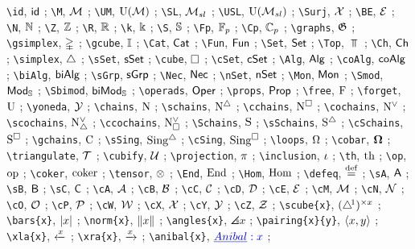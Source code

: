 \verb|\id|, $\id$ ;
\verb|\M|, $\M$ ;
\verb|\UM|, $\UM$ ;
\verb|\SL|, $\SL$ ;
\verb|\USL|, $\USL$ ;
\verb|\Surj|, $\Surj$ ;
\verb|\BE|, $\BE$ ;
\verb|\N|, $\N$ ;
\verb|\Z|, $\Z$ ;
\verb|\R|, $\R$ ;
\verb|\k|, $\k$ ;
\verb|\S|, $\S$ ;
\verb|\Fp|, $\Fp$ ;
\verb|\Cp|, $\Cp$ ;
\verb|\graphs|, $\graphs$ ;
\verb|\gsimplex|, $\gsimplex$ ;
\verb|\gcube|, $\gcube$ ;
\verb|\Cat|, $\Cat$ ;
\verb|\Fun|, $\Fun$ ;
\verb|\Set|, $\Set$ ;
\verb|\Top|, $\Top$ ;
\verb|\Ch|, $\Ch$ ;
\verb|\simplex|, $\simplex$ ;
\verb|\sSet|, $\sSet$ ;
\verb|\cube|, $\cube$ ;
\verb|\cSet|, $\cSet$ ;
\verb|\Alg|, $\Alg$ ;
\verb|\coAlg|, $\coAlg$ ;
\verb|\biAlg|, $\biAlg$ ;
\verb|\sGrp|, $\sGrp$ ;
\verb|\Nec|, $\Nec$ ;
\verb|\nSet|, $\nSet$ ;
\verb|\Mon|, $\Mon$ ;
\verb|\Smod|, $\Smod$ ;
\verb|\Sbimod|, $\Sbimod$ ;
\verb|\operads|, $\operads$ ;
\verb|\props|, $\props$ ;
\verb|\free|, $\free$ ;
\verb|\forget|, $\forget$ ;
\verb|\yoneda|, $\yoneda$ ;
\verb|\chains|, $\chains$ ;
\verb|\schains|, $\schains$ ;
\verb|\cchains|, $\cchains$ ;
\verb|\cochains|, $\cochains$ ;
\verb|\scochains|, $\scochains$ ;
\verb|\ccochains|, $\ccochains$ ;
\verb|\Schains|, $\Schains$ ;
\verb|\sSchains|, $\sSchains$ ;
\verb|\cSchains|, $\cSchains$ ;
\verb|\gchains|, $\gchains$ ;
\verb|\sSing|, $\sSing$ ;
\verb|\cSing|, $\cSing$ ;
\verb|\loops|, $\loops$ ;
\verb|\cobar|, $\cobar$ ;
\verb|\triangulate|, $\triangulate$ ;
\verb|\cubify|, $\cubify$ ;
\verb|\projection|, $\projection$ ;
\verb|\inclusion|, $\inclusion$ ;
\verb|\th|, $\th$ ;
\verb|\op|, $\op$ ;
\verb|\coker|, $\coker$ ;
\verb|\tensor|, $\tensor$ ;
\verb|\End|, $\End$ ;
\verb|\Hom|, $\Hom$ ;
\verb|\defeq|, $\defeq$ ;
\verb|\sA|, $\sA$ ;
\verb|\sB|, $\sB$ ;
\verb|\sC|, $\sC$ ;
\verb|\cA|, $\cA$ ;
\verb|\cB|, $\cB$ ;
\verb|\cC|, $\cC$ ;
\verb|\cD|, $\cD$ ;
\verb|\cE|, $\cE$ ;
\verb|\cM|, $\cM$ ;
\verb|\cN|, $\cN$ ;
\verb|\cO|, $\cO$ ;
\verb|\cP|, $\cP$ ;
\verb|\cW|, $\cW$ ;
\verb|\cX|, $\cX$ ;
\verb|\cY|, $\cY$ ;
\verb|\cZ|, $\cZ$ ;
\verb|\scube{x}|, $\scube{x}$ ;
\verb|\bars{x}|, $\bars{x}$ ;
\verb|\norm{x}|, $\norm{x}$ ;
\verb|\angles{x}|, $\angles{x}$ ;
\verb|\pairing{x}{y}|, $\pairing{x}{y}$ ;
\verb|\xla{x}|, $\xla{x}$ ;
\verb|\xra{x}|, $\xra{x}$ ;
\verb|\anibal{x}|, $\anibal{x}$ ;
